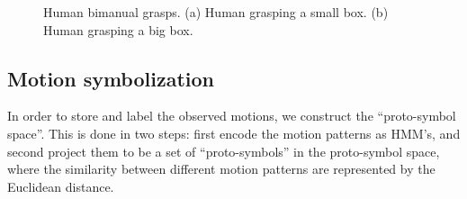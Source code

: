 \begin{figure}
\centering
  \caption{ \scriptsize{Human bimanual grasps. (a) Human grasping a small box. (b) Human grasping a big box.}}
  \label{fig:bimanual}
\end{figure}


\subsection{Motion symbolization}
\label{cha5:sec2:symbolization}
In order to store and label the observed motions, we construct the ``proto-symbol space''. This is done in two steps: first encode the motion patterns as HMM's, and second project them to be a set of ``proto-symbols'' in the proto-symbol space, where the similarity between different motion patterns are represented by the Euclidean distance.

